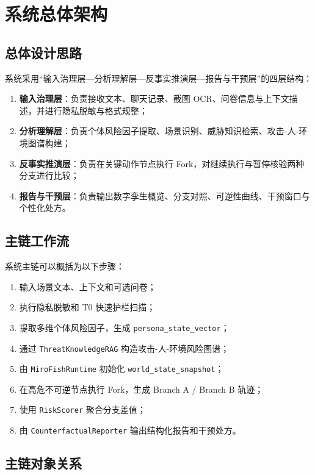 \documentclass[12pt,a4paper]{ctexart}
\begin{document}
\section{系统总体架构}

\subsection{总体设计思路}

系统采用“输入治理层—分析理解层—反事实推演层—报告与干预层”的四层结构：
\begin{enumerate}[leftmargin=2em]
  \item \textbf{输入治理层}：负责接收文本、聊天记录、截图 OCR、问卷信息与上下文描述，并进行隐私脱敏与格式规整；
  \item \textbf{分析理解层}：负责个体风险因子提取、场景识别、威胁知识检索、攻击-人-环境图谱构建；
  \item \textbf{反事实推演层}：负责在关键动作节点执行 Fork，对继续执行与暂停核验两种分支进行比较；
  \item \textbf{报告与干预层}：负责输出数字孪生概览、分支对照、可逆性曲线、干预窗口与个性化处方。
\end{enumerate}

\subsection{主链工作流}

系统主链可以概括为以下步骤：
\begin{enumerate}[leftmargin=2em]
  \item 输入场景文本、上下文和可选问卷；
  \item 执行隐私脱敏和 T0 快速护栏扫描；
  \item 提取多维个体风险因子，生成 \texttt{persona\_state\_vector}；
  \item 通过 \texttt{ThreatKnowledgeRAG} 构造攻击-人-环境风险图谱；
  \item 由 \texttt{MiroFishRuntime} 初始化 \texttt{world\_state\_snapshot}；
  \item 在高危不可逆节点执行 Fork，生成 Branch A / Branch B 轨迹；
  \item 使用 \texttt{RiskScorer} 聚合分支差值；
  \item 由 \texttt{CounterfactualReporter} 输出结构化报告和干预处方。
\end{enumerate}

\subsection{主链对象关系}
\end{document}

